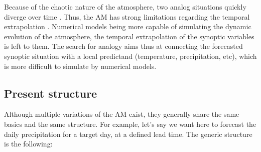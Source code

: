 \documentclass[review]{elsarticle}
\begin{document}
Because of the chaotic nature of the atmosphere, two analog situations quickly diverge over time \citep{Lorenz1969}. Thus, the AM has strong limitations regarding the temporal extrapolation \citep{Bontron2004}. Numerical models being more capable of simulating the dynamic evolution of the atmosphere, the temporal extrapolation of the synoptic variables is left to them. The search for analogy aims thus at connecting the forecasted synoptic situation with a local predictand (temperature, precipitation, etc), which is more difficult to simulate by numerical models.


\subsection{Present structure}

Although multiple variations of the AM exist, they generally share the same basics and the same structure. For example, let's say we want here to forecast the daily precipitation for a target day, at a defined lead time. The generic structure is the following:
\end{document}
